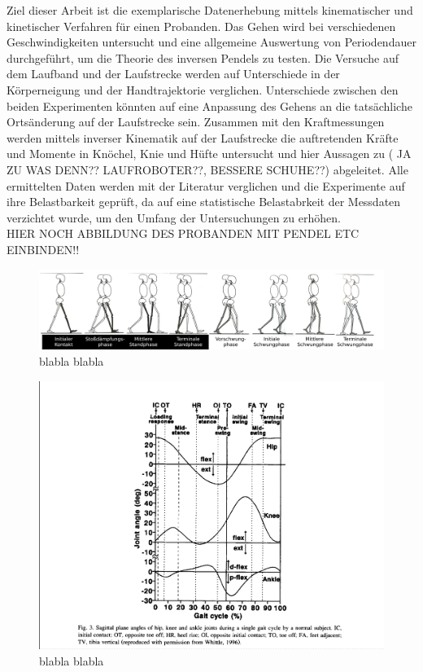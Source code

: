 Ziel dieser Arbeit ist die exemplarische Datenerhebung mittels kinematischer und kinetischer Verfahren für einen Probanden. Das Gehen wird bei verschiedenen Geschwindigkeiten untersucht und eine allgemeine Auswertung von Periodendauer durchgeführt, um die Theorie des inversen Pendels zu testen. Die Versuche auf dem Laufband und der Laufstrecke werden auf Unterschiede in der Körperneigung und der Handtrajektorie verglichen. Unterschiede zwischen den beiden Experimenten könnten auf eine Anpassung des Gehens an die tatsächliche Ortsänderung auf der Laufstrecke sein. Zusammen mit den Kraftmessungen werden mittels inverser Kinematik auf der Laufstrecke die auftretenden Kräfte und Momente in Knöchel, Knie und Hüfte untersucht und hier Aussagen zu ( JA ZU WAS DENN?? LAUFROBOTER??, BESSERE SCHUHE??) abgeleitet. Alle ermittelten Daten werden mit der Literatur verglichen und die Experimente auf ihre Belastbarkeit geprüft, da auf eine statistische Belastabrkeit der Messdaten verzichtet wurde, um den Umfang der Untersuchungen zu erhöhen.\\
HIER NOCH ABBILDUNG DES PROBANDEN MIT PENDEL ETC EINBINDEN!!

\begin{figure}
	\centering
	\includegraphics[width=\linewidth]{bilder/Einleitung/Skizze_Gangphasen_small}
	\caption[Gangphasen]{blabla blabla}
	\label{fig:Skizze_Phasen}
\end{figure}





\begin{figure}
	\centering
	\includegraphics[width=0.7\linewidth]{bilder/Einleitung/gangphasen}
	\caption[Gangphasen]{blabla blabla}
	\label{fig:gangphasen}
\end{figure}